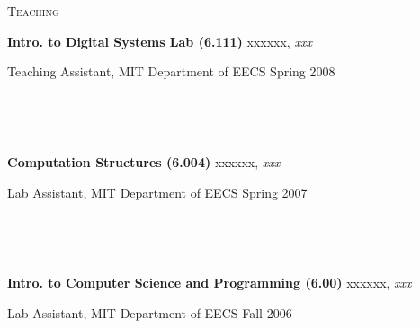 \documentclass[10pt,times]{report}
\newlength{\sectiongap}
\newlength{\entrygap}
\newlength{\sectioncolwidth}
\newlength{\colgap}
\newlength{\stuffwidth}
\def\ifEqString#1#2{\def\testa{#1}\def\testb{#2}%
  \ifx\testa\testb}
\newenvironment{rtable}{
  \begin{minipage}{\textwidth}
  }{
  \end{minipage}
}
\newenvironment{rentry}[3][xxx]{
  \begin{minipage}[t]{\hsize}
    \textbf{#2}\ifEqString{#1}{xxx}\relax\else, \textit{#1}\fi
    \hspace{\stretch{1}} #3 \\
  }{
    \removelastskip
  \end{minipage}
  \\[\entrygap]  %
}
\newcommand{\rline}[2]{
  \begin{minipage}[t]{\hsize}
    #1 \hspace{\stretch{1}} #2
  \end{minipage} \\
}
\newenvironment{rsection}[1]{
  \begin{minipage}[t]{\sectioncolwidth}
    \textsc{#1}
  \end{minipage}
  \hspace{\colgap}
  \begin{minipage}[t]{\stuffwidth}
  }{
    \removelastskip
  \end{minipage}
  \\[\sectiongap]
}
\begin{document}
\begin{rtable}
\begin{rsection}{Teaching}
    \begin{rentry}{Intro. to Digital Systems Lab (6.111)}{}
      \rline{Teaching Assistant, MIT Department of EECS}{Spring
        2008} 
    \end{rentry}    

    \begin{rentry}{Computation Structures (6.004)}{}
      \rline{Lab Assistant, MIT Department of EECS}{Spring 2007}
    \end{rentry}

    \begin{rentry}{Intro. to Computer Science and
        Programming (6.00)}{}
      \rline{Lab Assistant, MIT Department of EECS}{Fall 2006}
    \end{rentry}
  \end{rsection}


\end{rtable}
\end{document}
